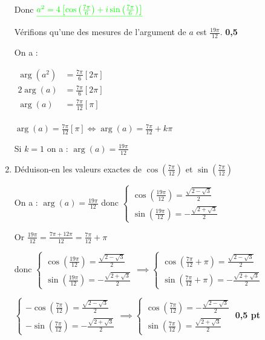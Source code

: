 \documentclass[12pt,a4paper]{article}
\begin{document}
\begin{enumerate}
     Donc $\textcolor{green}{\underline{a^2 = 4\left[ \cos\left( \frac{7\pi}{6}\right) +i\sin\left( \frac{7\pi}{6}\right)  \right]}} $
     
    Vérifions qu’une des mesures de l’argument de $a$ est $\frac{19\pi}{12}$. \hfill \textbf{0,5}
    
    On a :
     
     $
     \begin{aligned}
		\arg(a^2)&=\frac{7\pi}{6}[2\pi]\\
		2\arg(a)&=\frac{7\pi}{6}[2\pi]\\
		\arg(a)&=\frac{7\pi}{12}[\pi]\\
     \end{aligned}
     $

$ \arg(a)=\frac{7\pi}{12}[\pi] \Leftrightarrow \arg(a)=\frac{7\pi}{12}+k\pi $

Si $k=1$ on a : $\arg(a)=\frac{19\pi}{12}$
    \item Déduison-en les valeurs exactes de $\cos\left(\frac{7\pi}{12}\right)$ et $\sin\left(\frac{7\pi}{12}\right)$

	    On a : $ \arg(a)=\frac{19\pi}{12} $ donc 
	    $
	    \begin{cases}
	    \cos\left(\frac{19\pi}{12}\right)=\frac{\sqrt{2 - \sqrt{3}}}{2}\\
	    \sin\left(\frac{19\pi}{12}\right)=-\frac{\sqrt{2 + \sqrt{3}}}{2}
	    \end{cases}
	     $
	     
	Or $\frac{19\pi}{12}=\frac{7\pi+12\pi}{12}=\frac{7\pi}{12}+\pi$
	
	  donc  $
	    \begin{cases}
	    \cos\left(\frac{19\pi}{12}\right)=\frac{\sqrt{2 - \sqrt{3}}}{2}\\
	    \sin\left(\frac{19\pi}{12}\right)=-\frac{\sqrt{2 + \sqrt{3}}}{2}
	    \end{cases}\implies
	    \begin{cases}
	    \cos\left(\frac{7\pi}{12}+\pi\right)=\frac{\sqrt{2 - \sqrt{3}}}{2}\\
	    \sin\left(\frac{7\pi}{12}+\pi\right)=-\frac{\sqrt{2 + \sqrt{3}}}{2}
	    \end{cases}
	    $
	    
		$
		\begin{cases}
	    -\cos\left(\frac{7\pi}{12}\right)=\frac{\sqrt{2 - \sqrt{3}}}{2}\\
	    -\sin\left(\frac{7\pi}{12}\right)=-\frac{\sqrt{2 + \sqrt{3}}}{2}
	    \end{cases}\implies
	   	\begin{cases}
	    \cos\left(\frac{7\pi}{12}\right)=-\frac{\sqrt{2 - \sqrt{3}}}{2}\\
	    \sin\left(\frac{7\pi}{12}\right)=\frac{\sqrt{2 + \sqrt{3}}}{2}
	    \end{cases}
	    $    \hfill \textbf{0,5 pt}
	    

\end{enumerate}
\end{document}
